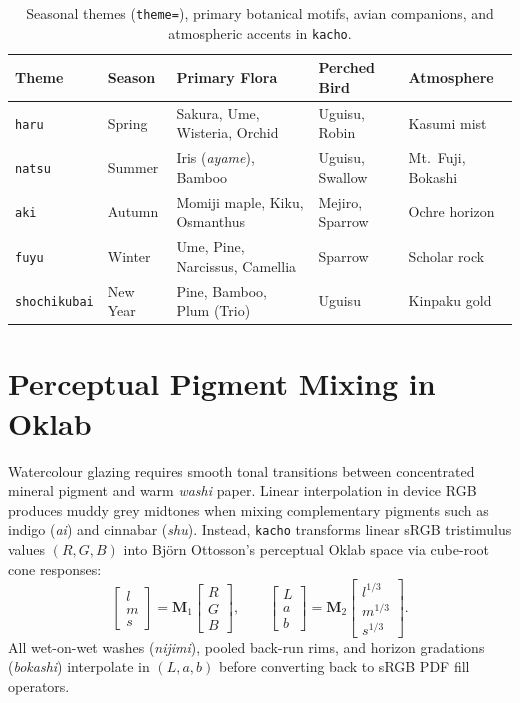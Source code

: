 \documentclass[11pt,a4paper,twoside]{article}
\begin{document}
\begin{table}[t]
\centering
\caption{Seasonal themes (\texttt{theme=}), primary botanical motifs, avian companions, and atmospheric accents in \texttt{kacho}.}
\label{tab:themes}
\medskip
\begin{tabular}{@{}lllll@{}}
\toprule
\textbf{Theme} & \textbf{Season} & \textbf{Primary Flora} & \textbf{Perched Bird} & \textbf{Atmosphere} \\
\midrule
\texttt{haru}        & Spring       & Sakura, Ume, Wisteria, Orchid     & Uguisu, Robin   & Kasumi mist \\
\texttt{natsu}       & Summer       & Iris (\emph{ayame}), Bamboo       & Uguisu, Swallow & Mt.\ Fuji, Bokashi \\
\texttt{aki}         & Autumn       & Momiji maple, Kiku, Osmanthus     & Mejiro, Sparrow & Ochre horizon \\
\texttt{fuyu}        & Winter       & Ume, Pine, Narcissus, Camellia    & Sparrow         & Scholar rock \\
\texttt{shochikubai} & New Year     & Pine, Bamboo, Plum (Trio)         & Uguisu          & Kinpaku gold \\
\bottomrule
\end{tabular}
\end{table}

\clearpage
{}

\section{Perceptual Pigment Mixing in Oklab}

Watercolour glazing requires smooth tonal transitions between concentrated mineral pigment and warm \emph{washi} paper. Linear interpolation in device RGB produces muddy grey midtones when mixing complementary pigments such as indigo (\emph{ai}) and cinnabar (\emph{shu}). Instead, \texttt{kacho} transforms linear sRGB tristimulus values $(R,G,B)$ into Bj\"orn Ottosson's perceptual Oklab space via cube-root cone responses:
\begin{equation}
  \begin{bmatrix} l \\ m \\ s \end{bmatrix} = \mathbf{M}_1 \begin{bmatrix} R \\ G \\ B \end{bmatrix},
  \qquad
  \begin{bmatrix} L \\ a \\ b \end{bmatrix} = \mathbf{M}_2 \begin{bmatrix} l^{1/3} \\ m^{1/3} \\ s^{1/3} \end{bmatrix}.
  \label{eq:oklab}
\end{equation}
All wet-on-wet washes (\emph{nijimi}), pooled back-run rims, and horizon gradations (\emph{bokashi}) interpolate in $(L,a,b)$ before converting back to sRGB PDF fill operators.
\end{document}
